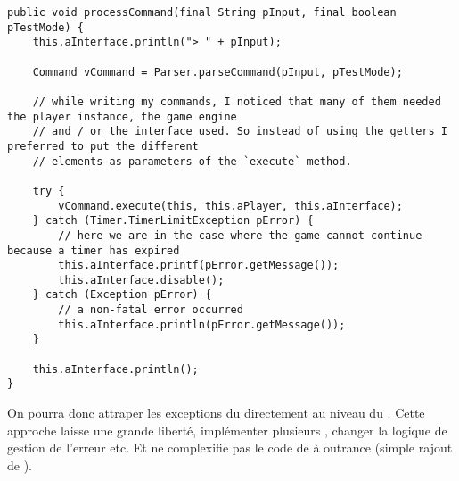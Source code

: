\begin{exercise}[subtitle=Limite de temps]
\begin{verbatim}
public void processCommand(final String pInput, final boolean pTestMode) {
    this.aInterface.println("> " + pInput);

    Command vCommand = Parser.parseCommand(pInput, pTestMode);

    // while writing my commands, I noticed that many of them needed the player instance, the game engine
    // and / or the interface used. So instead of using the getters I preferred to put the different
    // elements as parameters of the `execute` method.

    try {
        vCommand.execute(this, this.aPlayer, this.aInterface);
    } catch (Timer.TimerLimitException pError) {
        // here we are in the case where the game cannot continue because a timer has expired
        this.aInterface.printf(pError.getMessage());
        this.aInterface.disable();
    } catch (Exception pError) {
        // a non-fatal error occurred
        this.aInterface.println(pError.getMessage());
    }

    this.aInterface.println();
}
\end{verbatim}
 
On pourra donc attraper les exceptions du  directement au niveau du . Cette approche laisse une grande liberté, implémenter plusieurs , changer la logique de gestion de l'erreur etc. Et ne complexifie pas le code de  à outrance (simple rajout de ).

\end{exercise}

